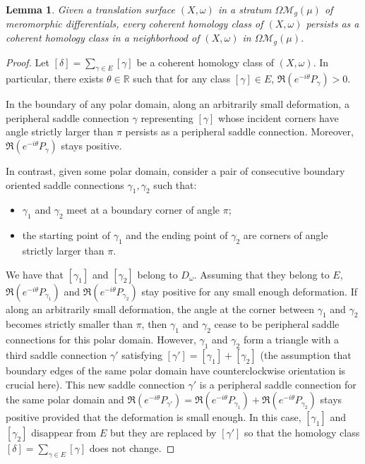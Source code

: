 \documentclass[10pt,a4paper]{amsart}
\newtheorem{lemma}{Lemma}
\begin{document}
\begin{lemma}\label{lem:Persistence}
Given a translation surface $(X,\omega)$ in a stratum $\Omega\mathcal{M}_{g}(\mu)$ of meromorphic differentials, every coherent homology class of $(X,\omega)$ persists as a coherent homology class in a neighborhood of $(X,\omega)$ in $\Omega\mathcal{M}_{g}(\mu)$.
\end{lemma}

\begin{proof}
Let $[\delta]=\sum\limits_{\gamma \in E} [\gamma]$ be a coherent homology class of $(X, \omega)$. In particular, there exists $\theta \in \mathbb{R}$ such that for any class $[\gamma] \in E$, $\Re\left(e^{-i\theta} P_{\gamma} \right)>0$.
\par
In the boundary of any polar domain, along an arbitrarily small deformation, a peripheral saddle connection $\gamma$ representing $[\gamma]$ whose incident corners have angle strictly larger than $\pi$ persists as a peripheral saddle connection. Moreover, $\Re\left(e^{-i\theta} P_{\gamma} \right)$ stays positive.
\par
In contrast, given some polar domain, consider a pair of consecutive boundary oriented saddle connections $\gamma_{1},\gamma_{2}$ such that:
\begin{itemize}
    \item $\gamma_{1}$ and $\gamma_{2}$ meet at a boundary corner of angle $\pi$;
    \item the starting point of $\gamma_{1}$ and the ending point of $\gamma_{2}$ are corners of angle strictly larger than $\pi$.
\end{itemize}
We have that $[\gamma_{1}]$ and $[\gamma_{2}]$ belong to $D_\omega$. Assuming that they belong to $E$, $\Re\left(e^{-i\theta} P_{\gamma_{1}} \right)$ and $\Re\left(e^{-i\theta} P_{\gamma_{2}} \right)$ stay positive for any small enough deformation. If along an arbitrarily small deformation, the angle at the corner between $\gamma_{1}$ and $\gamma_{2}$ becomes strictly smaller than $\pi$, then $\gamma_{1}$ and $\gamma_{2}$ cease to be peripheral saddle connections for this polar domain. However, $\gamma_{1}$ and $\gamma_{2}$ form a triangle with a third saddle connection $\gamma'$ satisfying $[\gamma']=[\gamma_{1}]+[\gamma_{2}]$ (the assumption that boundary edges of the same polar domain have counterclockwise orientation is crucial here). This new saddle connection $\gamma'$ is a peripheral saddle connection for the same polar domain and $\Re\left(e^{-i\theta} P_{\gamma'} \right)= \Re\left(e^{-i\theta} P_{\gamma_{1}} \right) +\Re\left(e^{-i\theta} P_{\gamma_{2}} \right)$ stays positive provided that the deformation is small enough. In this case, $[\gamma_{1}]$ and $[\gamma_{2}]$ disappear from $E$ but they are replaced by $[\gamma']$ so that the homology class $[\delta]=\sum\limits_{\gamma \in E} [\gamma]$  does not change.

\end{proof}
\end{document}
